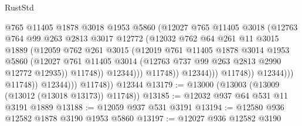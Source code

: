 \begin{lexlean}{RustStd}
\begin{coremodule}
{\begin{coremodule}
{{{{{{{{{{{{{{{{{{{{{{{{{{{{{                                      @765
                                      @11405
                                      @1878
                                      @3018
                                      @1953
                                      @5860
                                      (@12027
                                        @765
                                        @11405
                                        @3018
                                        (@12763
                                          @764
                                          @99
                                          @263
                                          @2813
                                          @3017
                                          @12772
                                          (@12032
                                            @762
                                            @64
                                            @261
                                            @11
                                            @3015
                                            @1889
                                            (@12059
                                              @762
                                              @261
                                              @3015
                                              (@12019
                                                @761
                                                @11405
                                                @1878
                                                @3014
                                                @1953
                                                @5860
                                                (@12027
                                                  @761
                                                  @11405
                                                  @3014
                                                  (@12763 @737 @99 @263 @2813 @2990 @12772 @12935))
                                                @11748))
                                            @12344)))
                                      @11748))
                                  @12344)))
                            @11748))
                        @12344)))
                  @11748))
              @12344)))
        @11748))
    @12344
@13179 := @13000 (@13003 (@13009 (@13012 (@13018 @13173)) @11748))
@13185 := @12032 @937 @64 @531 @11 @3191 @1889
@13188 := @12059 @937 @531 @3191
@13194 := @12580 @936 @12582 @1878 @3190 @1953 @5860
@13197 := @12027 @936 @12582 @3190
}}}}}}}}}}}}}}}}}}}}}}}}}}}}}
\end{coremodule}}
\end{coremodule}
\end{lexlean}
